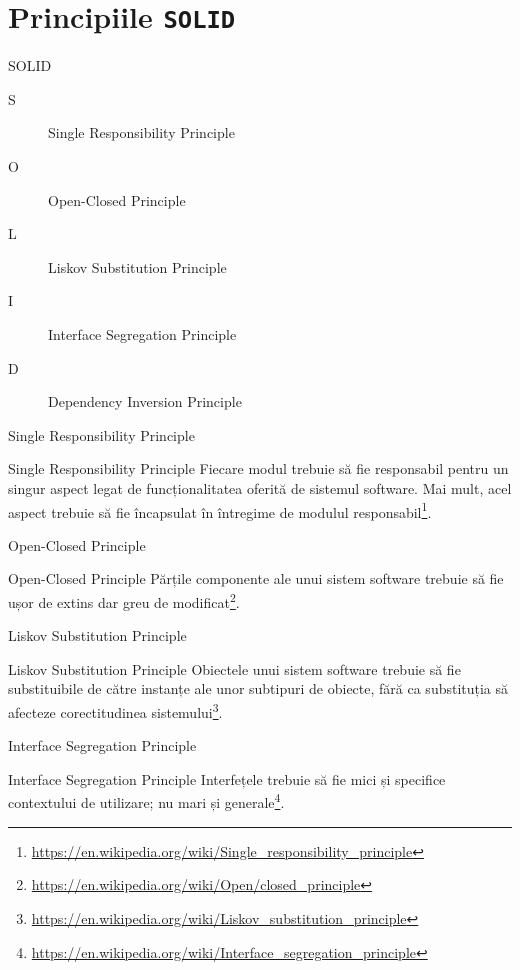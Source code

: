 \documentclass[presentation]{beamer}
\begin{document}
\section{Principiile \texttt{SOLID}}
\label{sec:org5aa08ed}
\begin{frame}[label={sec:orgdf0f763}]{SOLID}
\begin{description}
\item[{S}] Single Responsibility Principle
\item[{O}] Open-Closed Principle
\item[{L}] Liskov Substitution Principle
\item[{I}] Interface Segregation Principle
\item[{D}] Dependency Inversion Principle
\end{description}
\end{frame}
\begin{frame}[label={sec:org338ef08}]{Single Responsibility Principle}
\begin{block}{Single Responsibility Principle}
Fiecare modul trebuie să fie responsabil pentru un singur aspect legat de funcționalitatea oferită de sistemul software. Mai mult, acel aspect trebuie să fie încapsulat în întregime de modulul responsabil\footnote{\url{https://en.wikipedia.org/wiki/Single\_responsibility\_principle}}.
\end{block}
\end{frame}
\begin{frame}[label={sec:org3048771}]{Open-Closed Principle}
\begin{block}{Open-Closed Principle}
Părțile componente ale unui sistem software trebuie să fie ușor de extins dar greu de modificat\footnote{\url{https://en.wikipedia.org/wiki/Open/closed\_principle}}.
\end{block}
\end{frame}
\begin{frame}[label={sec:org31ab77d}]{Liskov Substitution Principle}
\begin{block}{Liskov Substitution Principle}
Obiectele unui sistem software trebuie să fie substituibile de către instanțe ale unor subtipuri de obiecte, fără ca substituția să afecteze corectitudinea sistemului\footnote{\url{https://en.wikipedia.org/wiki/Liskov\_substitution\_principle}}.
\end{block}
\end{frame}
\begin{frame}[label={sec:org8beb6a8}]{Interface Segregation Principle}
\begin{block}{Interface Segregation Principle}
Interfețele trebuie să fie mici și specifice contextului de utilizare; nu mari și generale\footnote{\url{https://en.wikipedia.org/wiki/Interface\_segregation\_principle}}.
\end{block}
\end{frame}
\end{document}

